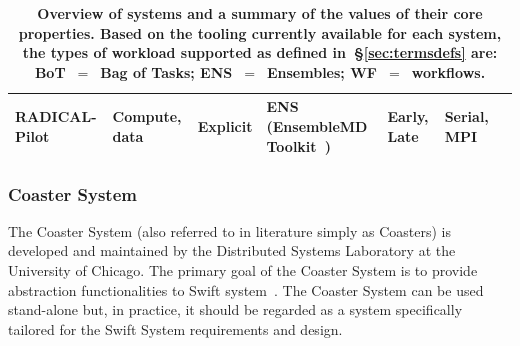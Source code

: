\documentclass{sig-alternate}
\begin{document}
\begin{table}
\begin{tabular}{p{2.5cm}p{2.25cm}p{2cm}p{5cm}p{1.75cm}p{1.75cm}p{1.75cm}|}
    RADICAL-Pilot &
    Compute, data &
    Explicit &
    ENS (EnsembleMD Toolkit~\cite{emdtoolkit_url}) &
    Early, Late &
    Serial, MPI \\

 \bottomrule

 \end{tabular}
 \caption{\textbf{Overview of \pilot systems and a summary of the values of
 their core properties. Based on the tooling currently available for each \pilot
 system, the types of workload supported as defined in~\S\ref{sec:termsdefs}
 are: BoT~$=$~Bag of Tasks; ENS~$=$~Ensembles; WF~$=$~workflows.}}
 \label{table:implementations-properties}
\end{table}




%
\subsubsection{Coaster System}\label{sec:coaster}

The Coaster System (also referred to in literature simply as Coasters) is
developed and maintained by the Distributed Systems Laboratory at the University
of Chicago. The primary goal of the Coaster System is to provide \pilot
abstraction functionalities to Swift system~\cite{wilde2011swift,zhao2007swift}.
The Coaster System can be used stand-alone but, in practice, it should be
regarded as a system specifically tailored for the Swift System requirements and
design.
\end{document}
